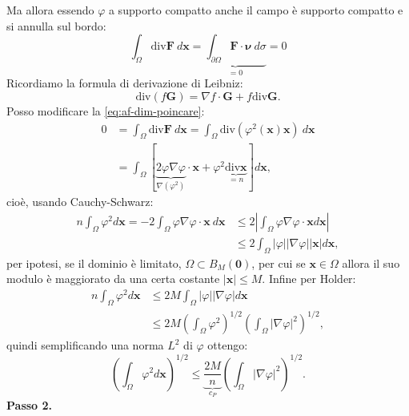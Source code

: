 \documentclass[10pt,a4paper,twoside,openright]{book}
\newcommand{\x}{\mathbf{x}}
\begin{document}
\begin{dimostrazione}
	Ma allora essendo $\displaystyle \varphi $ a supporto compatto anche il campo è supporto compatto e si annulla sul bordo:
	\begin{equation}
		\int _{\Omega }\mathrm{div}\mathbf{F} \ d\x =\underbrace{\int _{\partial \Omega }\mathbf{F} \cdotp \bm{\nu }\ d\sigma }_{=0} =0
		\label{eq:af-dim-poincare}
	\end{equation}
	Ricordiamo la formula di derivazione di Leibniz:
	\begin{equation*}
		\mathrm{div}( f\mathbf{G}) =\nabla f\cdotp \mathbf{G} +f\mathrm{div}\mathbf{G} .
	\end{equation*}
	Posso modificare la \eqref{eq:af-dim-poincare}:
	\begin{align*}
		0 & =\int _{\Omega }\mathrm{div}\mathbf{F} \ d\x =\int _{\Omega }\mathrm{div}\left( \varphi ^{2}(\x)\x\right) \ d\x                                              \\
		  & =\int _{\Omega }\left[\underbrace{2\varphi \nabla \varphi }_{\nabla \left( \varphi ^{2}\right)} \cdotp \x +\varphi ^{2}\underbrace{\mathrm{div}\x}_{=n}\right] d\x , 
	\end{align*}
	cioè, usando Cauchy-Schwarz:
	\begin{align*}
		n\int _{\Omega } \varphi ^{2} d\x =-2\int _{\Omega } \varphi \nabla \varphi \cdotp \x \ d\x & \leqslant 2\left| \int _{\Omega } \varphi \nabla \varphi \cdotp \x d\x\right| \\
		                                                                                                                    & \leqslant 2\int _{\Omega }| \varphi | | \nabla \varphi | | \x| d\x ,          
	\end{align*}
	per ipotesi, se il dominio è limitato, $\displaystyle \Omega \subset B_{M}(\mathbf{0})$, per cui se $\displaystyle \x \in \Omega $ allora il suo modulo è maggiorato da una certa costante $\displaystyle | \x| \leqslant M$. Infine per Holder:
	\begin{align*}
		n\int _{\Omega } \varphi ^{2} d\x & \leqslant 2M\int _{\Omega }| \varphi | | \nabla \varphi | d\x                                                  \\
		                                          & \leqslant 2M\left(\int _{\Omega } \varphi ^{2}\right)^{1/2}\left(\int _{\Omega }| \nabla \varphi | ^{2}\right)^{1/2} , 
	\end{align*}
	quindi semplificando una norma $\displaystyle L^{2}$ di $\displaystyle \varphi $ ottengo:
	\begin{equation*}
		\left(\int _{\Omega } \varphi ^{2} d\x\right)^{1/2} \leqslant \underbrace{\frac{2M}{n}}_{c_{P}}\left(\int _{\Omega }| \nabla \varphi | ^{2}\right)^{1/2} .
	\end{equation*}
	\textbf{Passo 2.}
	

\end{dimostrazione}
\end{document}
